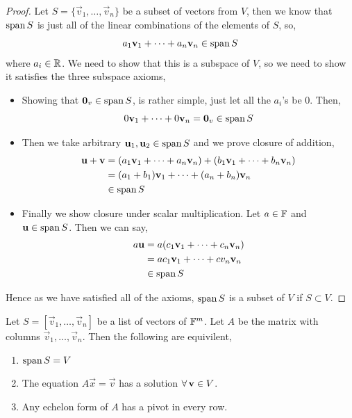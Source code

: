 \documentclass{article}
\begin{document}
\begin{proof}
  Let $S = \{\vec v_1, \dots, \vec v_n\}$ be a subset of vectors from $V$, then we know that $\operatorname{span} S$ is just all of the linear combinations of the elements of $S$, so,
  $$ a_1\boldsymbol{\mathbf{v}}_1 + \dots + a_n\boldsymbol{\mathbf{v}}_n \in \operatorname{span} S $$
  where $a_i \in \mathbb{R}$. We need to show that this is a subspace of $V$, so we need to show it satisfies the three subspace axioms,
  \begin{itemize}
    \item Showing that $\boldsymbol{\mathbf{0}}_v \in \operatorname{span} S$, is rather simple, just let all the $a_i$'s be 0. Then,
    $$ 0\boldsymbol{\mathbf{v}}_1 + \dots + 0\boldsymbol{\mathbf{v}}_n = \boldsymbol{\mathbf{0}}_v \in \operatorname{span} S $$
    \item Then we take arbitrary $\boldsymbol{\mathbf{u}}_1, \boldsymbol{\mathbf{u}}_2 \in \operatorname{span} S$ and we prove closure of addition,
    \begin{align*}
      \boldsymbol{\mathbf{u}} + \boldsymbol{\mathbf{v}} &= (a_1\boldsymbol{\mathbf{v}}_1 + \dots + a_n\boldsymbol{\mathbf{v}}_n) + (b_1\boldsymbol{\mathbf{v}}_1 + \dots + b_n\boldsymbol{\mathbf{v}}_n)\\
      &= (a_1 + b_1)\boldsymbol{\mathbf{v}}_1 + \dots + (a_n + b_n)\boldsymbol{\mathbf{v}}_n\\
      &\in \operatorname{span} S
    \end{align*}
    \item Finally we show closure under scalar multiplication. Let $a\in \mathbb{F}$ and $\boldsymbol{\mathbf{u}} \in \operatorname{span} S$. Then we can say,
    \begin{align*}
      a\boldsymbol{\mathbf{u}} &= a(c_1\boldsymbol{\mathbf{v}}_1 + \dots + c_n\boldsymbol{\mathbf{v}}_n)\\
      &= ac_1\boldsymbol{\mathbf{v}}_1 + \dots + cv_n \boldsymbol{\mathbf{v}}_n\\
      &\in \operatorname{span} S
    \end{align*}
  \end{itemize}
  Hence as we have satisfied all of the axioms, $\operatorname{span} S$ is a subset of $V$ if $S \subset V$.
\end{proof}

\begin{nlemma}
  Let $S = [\vec v_1, \dots, \vec v_n]$ be a list of vectors of $\mathbb{F}^m$. Let $A$ be the matrix with columns $\vec v_1, \dots, \vec v_n$. Then the following are equivilent,
  \begin{enumerate}
    \item $\operatorname{span} S = V$
    \item The equation $A\vec x = \vec v$ has a solution $\forall\, \boldsymbol{\mathbf{v}} \in V$.
    \item Any echelon form of $A$ has a pivot in every row.
  \end{enumerate}
\end{nlemma}
\end{document}
